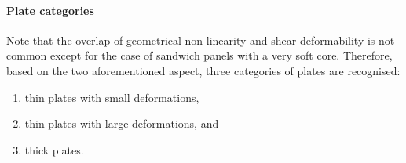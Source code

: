 \paragraph{Plate categories} Note that the overlap of geometrical non-linearity and shear deformability is not common except for the case of sandwich panels with a very soft core. Therefore, based on the two aforementioned aspect, three categories of plates are recognised:
\begin{enumerate}
\item thin plates with small deformations,
\item thin plates with large deformations, and
\item thick plates.
\end{enumerate}









